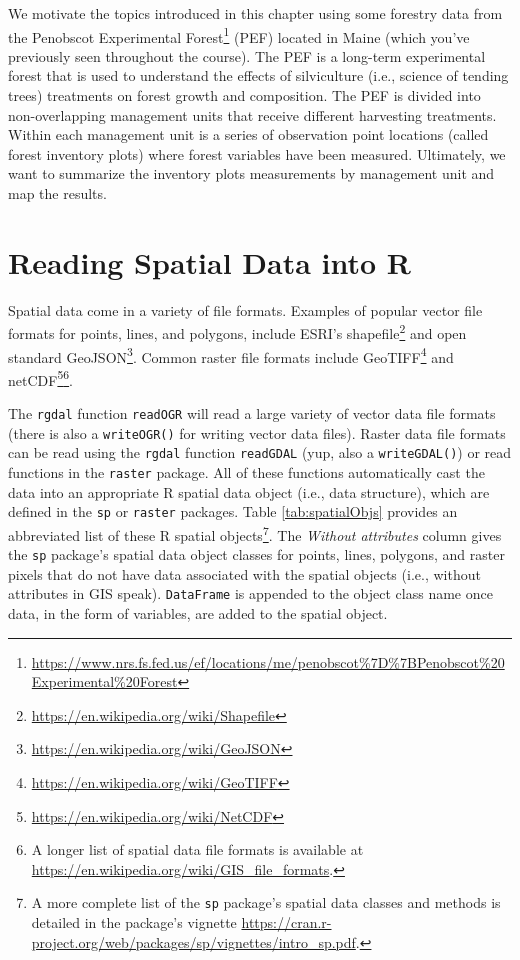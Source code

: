 \documentclass[]{krantz}
\renewcommand{\href}[2]{#2\footnote{\url{#1}}}
\begin{document}
We motivate the topics introduced in this chapter using some forestry data from the \href{https://www.nrs.fs.fed.us/ef/locations/me/penobscot\%7D\%7BPenobscot\%20Experimental\%20Forest}{Penobscot Experimental Forest} (PEF) located in Maine (which you've previously seen throughout the course). The PEF is a long-term experimental forest that is used to understand the effects of silviculture (i.e., science of tending trees) treatments on forest growth and composition. The PEF is divided into non-overlapping management units that receive different harvesting treatments. Within each management unit is a series of observation point locations (called forest inventory plots) where forest variables have been measured. Ultimately, we want to summarize the inventory plots measurements by management unit and map the results.

\hypertarget{reading-spatial-data-into-r}{%
\section{Reading Spatial Data into R}\label{reading-spatial-data-into-r}}

Spatial data come in a variety of file formats. Examples of popular vector file formats for points, lines, and polygons, include ESRI's \href{https://en.wikipedia.org/wiki/Shapefile}{shapefile} and open standard \href{https://en.wikipedia.org/wiki/GeoJSON}{GeoJSON}. Common raster file formats include \href{https://en.wikipedia.org/wiki/GeoTIFF}{GeoTIFF} and \href{https://en.wikipedia.org/wiki/NetCDF}{netCDF}\footnote{A longer list of spatial data file formats is available at \url{https://en.wikipedia.org/wiki/GIS_file_formats}.}.

The \texttt{rgdal} function \texttt{readOGR} will read a large variety of vector data file formats (there is also a \texttt{writeOGR()} for writing vector data files). Raster data file formats can be read using the \texttt{rgdal} function \texttt{readGDAL} (yup, also a \texttt{writeGDAL()}) or read functions in the \texttt{raster} package. All of these functions automatically cast the data into an appropriate R spatial data object (i.e., data structure), which are defined in the \texttt{sp} or \texttt{raster} packages. Table \ref{tab:spatialObjs} provides an abbreviated list of these R spatial objects\footnote{A more complete list of the \texttt{sp} package's spatial data classes and methods is detailed in the package's vignette \url{https://cran.r-project.org/web/packages/sp/vignettes/intro_sp.pdf}.}. The \emph{Without attributes }column gives the \texttt{sp} package's spatial data object classes for points, lines, polygons, and raster pixels that do not have data associated with the spatial objects (i.e., without attributes in GIS speak). \texttt{DataFrame} is appended to the object class name once data, in the form of variables, are added to the spatial object.
\end{document}
